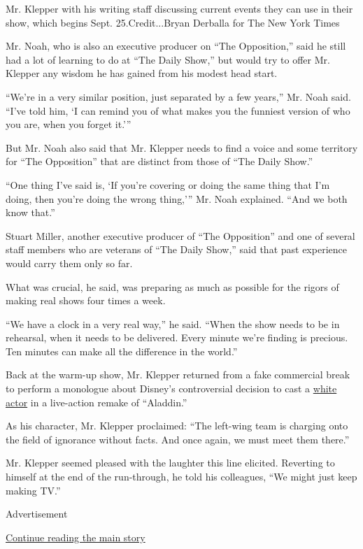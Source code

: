Mr. Klepper with his writing staff discussing current events they can
use in their show, which begins Sept. 25.Credit...Bryan Derballa for The
New York Times

Mr. Noah, who is also an executive producer on ``The Opposition,'' said
he still had a lot of learning to do at ``The Daily Show,'' but would
try to offer Mr. Klepper any wisdom he has gained from his modest head
start.

``We're in a very similar position, just separated by a few years,'' Mr.
Noah said. ``I've told him, `I can remind you of what makes you the
funniest version of who you are, when you forget it.'''

But Mr. Noah also said that Mr. Klepper needs to find a voice and some
territory for ``The Opposition'' that are distinct from those of ``The
Daily Show.''

``One thing I've said is, `If you're covering or doing the same thing
that I'm doing, then you're doing the wrong thing,''' Mr. Noah
explained. ``And we both know that.''

Stuart Miller, another executive producer of ``The Opposition'' and one
of several staff members who are veterans of ``The Daily Show,'' said
that past experience would carry them only so far.

What was crucial, he said, was preparing as much as possible for the
rigors of making real shows four times a week.

``We have a clock in a very real way,'' he said. ``When the show needs
to be in rehearsal, when it needs to be delivered. Every minute we're
finding is precious. Ten minutes can make all the difference in the
world.''

Back at the warm-up show, Mr. Klepper returned from a fake commercial
break to perform a monologue about Disney's controversial decision to
cast a
\href{http://screenrant.com/is-billy-magnussens-aladdin-character-a-whitewashed-prince-achmed/}{white
actor} in a live-action remake of ``Aladdin.''

As his character, Mr. Klepper proclaimed: ``The left-wing team is
charging onto the field of ignorance without facts. And once again, we
must meet them there.''

Mr. Klepper seemed pleased with the laughter this line elicited.
Reverting to himself at the end of the run-through, he told his
colleagues, ``We might just keep making TV.''

Advertisement

\protect\hyperlink{after-bottom}{Continue reading the main story}

